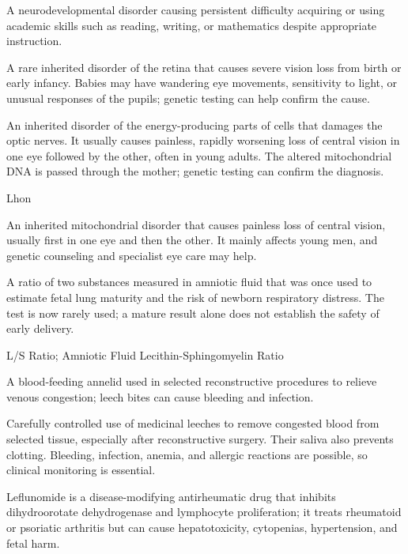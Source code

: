  A neurodevelopmental disorder causing persistent difficulty acquiring or using academic skills such as reading, writing, or mathematics despite appropriate instruction.

 A rare inherited disorder of the retina that causes severe vision loss from birth or early infancy. Babies may have wandering eye movements, sensitivity to light, or unusual responses of the pupils; genetic testing can help confirm the cause.

 An inherited disorder of the energy-producing parts of cells that damages the optic nerves. It usually causes painless, rapidly worsening loss of central vision in one eye followed by the other, often in young adults. The altered mitochondrial DNA is passed through the mother; genetic testing can confirm the diagnosis.

\synonyms
Lhon

 An inherited mitochondrial disorder that causes painless loss of central vision, usually first in one eye and then the other. It mainly affects young men, and genetic counseling and specialist eye care may help.

 A ratio of two substances measured in amniotic fluid that was once used to estimate fetal lung maturity and the risk of newborn respiratory distress. The test is now rarely used; a mature result alone does not establish the safety of early delivery.

\synonyms
L/S Ratio; Amniotic Fluid Lecithin-Sphingomyelin Ratio

 A blood-feeding annelid used in selected reconstructive procedures to relieve venous congestion; leech bites can cause bleeding and infection.

 Carefully controlled use of medicinal leeches to remove congested blood from selected tissue, especially after reconstructive surgery. Their saliva also prevents clotting. Bleeding, infection, anemia, and allergic reactions are possible, so clinical monitoring is essential.

 Leflunomide is a disease-modifying antirheumatic drug that inhibits dihydroorotate dehydrogenase and lymphocyte proliferation; it treats rheumatoid or psoriatic arthritis but can cause hepatotoxicity, cytopenias, hypertension, and fetal harm.

